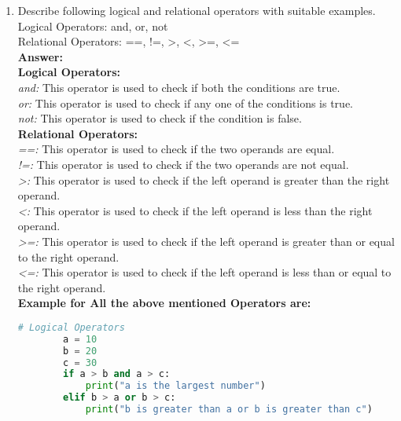 \documentclass[11pt]{article}
\begin{document}
\begin{enumerate}
	\item Describe following logical and relational operators with suitable examples.\\
	Logical Operators: and, or, not\\
	Relational Operators: ==, !=, >, <, >=, <=\\

	\textbf{Answer:}\\

	\textbf{Logical Operators:}\\

	\textit{and:} This operator is used to check if both the conditions are true.\\

	\textit{or:} This operator is used to check if any one of the conditions is true.\\

	\textit{not:} This operator is used to check if the condition is false.\\

	\textbf{Relational Operators:}\\

	\textit{==:} This operator is used to check if the two operands are equal.\\

	\textit{!=:} This operator is used to check if the two operands are not equal.\\

	\textit{>:} This operator is used to check if the left operand is greater than the right operand.\\

	\textit{<:} This operator is used to check if the left operand is less than the right operand.\\

	\textit{>=:} This operator is used to check if the left operand is greater than or equal to the right operand.\\

	\textit{<=:} This operator is used to check if the left operand is less than or equal to the right operand.\\
	
	\textbf{Example for All the above mentioned Operators are:}\\
	
	\begin{lstlisting}[language=Python]
		# Logical Operators
		a = 10
		b = 20
		c = 30
		if a > b and a > c:
			print("a is the largest number")
		elif b > a or b > c:
			print("b is greater than a or b is greater than c")


\end{lstlisting}
\end{enumerate}
\end{document}

